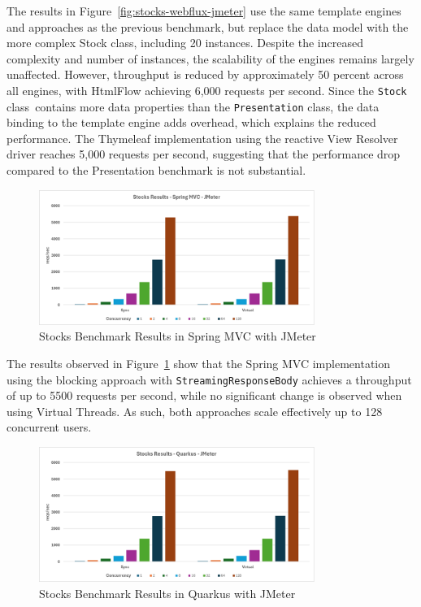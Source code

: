 The results in Figure~\ref{fig:stocks-webflux-jmeter} use the same template
engines and approaches as the previous benchmark, but replace the data model
with the more complex Stock class, including 20 instances. Despite the
increased complexity and number of instances, the scalability of the engines
remains largely unaffected. However, throughput is reduced by approximately 50
percent across all engines, with HtmlFlow achieving 6,000 requests per second.
Since the \texttt{Stock} class\ contains more data properties than the
\texttt{Presentation} class, the data binding to the template engine adds
overhead, which explains the reduced performance. The Thymeleaf implementation
using the reactive View Resolver driver reaches 5,000 requests per second,
suggesting that the performance drop compared to the Presentation benchmark is
not substantial.

\begin{figure}[h]
     \centering
     \includegraphics[width=0.8\textwidth]{./Graphs/stocks-springmvc-jmeter.png}
     \caption{Stocks Benchmark Results in Spring MVC with JMeter}\label{fig:stocks-springmvc-jmeter}
\end{figure}

The results observed in Figure~\ref{fig:stocks-springmvc-jmeter} show that the
Spring MVC implementation using the blocking approach with
\texttt{StreamingResponseBody} achieves a throughput of up to 5500 requests per
second, while no significant change is observed when using Virtual Threads. As
such, both approaches scale effectively up to 128 concurrent users.

\begin{figure}[h]
     \centering
     \includegraphics[width=0.8\textwidth]{./Graphs/stocks-quarkus-jmeter.png}
     \caption{Stocks Benchmark Results in Quarkus with JMeter}\label{fig:stocks-quarkus-jmeter}
\end{figure}

